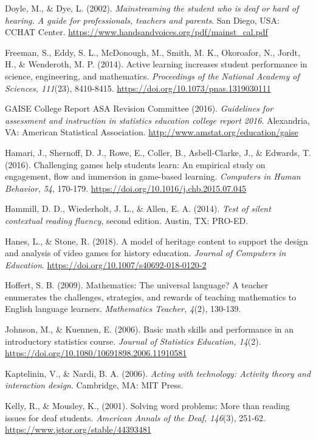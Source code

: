 \documentclass[11.5pt]{sig-alternate} %
\begin{document}
Doyle, M., \& Dye, L. (2002). \textit{Mainstreaming the student who is deaf or hard of hearing. A guide for professionals, teachers and parents}. San Diego, USA: CCHAT Center. \url{https://www.handsandvoices.org/pdf/mainst\_cal.pdf}

Freeman, S., Eddy, S. L., McDonough, M., Smith, M. K., Okoroafor, N., Jordt, H., \& Wenderoth, M. P. (2014). Active learning increases student performance in science, engineering, and mathematics. \textit{Proceedings of the National Academy of Sciences, 111}(23), 8410-8415. \url{https://doi.org/10.1073/pnas.1319030111} 

GAISE College Report ASA Revision Committee (2016). \textit{Guidelines for assessment and instruction in statistics education college report 2016}. Alexandria, VA: American Statistical Association. \url{http://www.amstat.org/education/gaise}

Hamari, J., Shernoff, D. J., Rowe, E., Coller, B., Asbell-Clarke, J., \& Edwards, T. (2016). Challenging games help students learn: An empirical study on engagement, flow and immersion in game-based learning. \textit{Computers in Human Behavior, 54}, 170-179. \url{https://doi.org/10.1016/j.chb.2015.07.045} 

Hammill, D. D., Wiederholt, J. L., \& Allen, E. A. (2014). \textit{Test of silent contextual reading fluency}, second edition. Austin, TX: PRO-ED.

Hanes, L., \& Stone, R. (2018). A model of heritage content to support the design and analysis of video games for history education. \textit{Journal of Computers in Education}. \url{https://doi.org/10.1007/s40692-018-0120-2} 

Hoffert, S. B. (2009). Mathematics: The universal language? A teacher enumerates the challenges, strategies, and rewards of teaching mathematics to English language learners. \textit{Mathematics Teacher, 4}(2), 130-139.

Johnson, M., \& Kuennen, E. (2006). Basic math skills and performance in an introductory statistics course. \textit{Journal of Statistics Education, 14}(2). \url{https://doi.org/10.1080/10691898.2006.11910581}

Kaptelinin, V., \& Nardi, B. A. (2006). \textit{Acting with technology: Activity theory and interaction design}. Cambridge, MA: MIT Press.

Kelly, R., \& Mousley, K., (2001). Solving word problems: More than reading issues for deaf students. \textit{American Annals of the Deaf, 146}(3), 251-62. \url{https://www.jstor.org/stable/44393481} 
\end{document}
